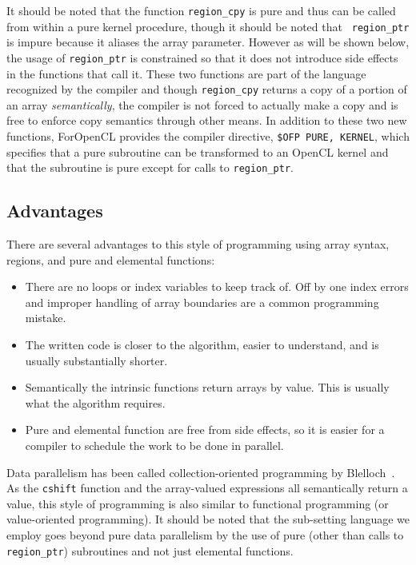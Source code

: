 It should be noted that the function {\tt region\_cpy} is pure and thus can be
called from within a pure kernel procedure, though it should be noted that {\tt
region\_ptr} is impure because it aliases the array parameter.  However as will
be shown below, the usage of {\tt region\_ptr} is constrained so that it does not
introduce side effects in the functions that call it.  These two functions are
part of the language recognized by the compiler and though {\tt region\_cpy}
returns a copy of a portion of an array \emph{semantically}, the compiler is not
forced to actually make a copy and is free to enforce copy semantics through
other means.  In addition to these two new functions, ForOpenCL provides the
compiler directive, {\tt \!\$OFP PURE, KERNEL}, which specifies that a pure subroutine
can be transformed to an OpenCL kernel and that the subroutine is pure
except for calls to {\tt region\_ptr}.

\subsection{Advantages}

There are several advantages to this style of programming using array
syntax, regions, and pure and elemental functions:

\begin{itemize}
\item There are no loops or index variables to keep track of.  Off by
  one index errors and improper handling of array boundaries are a
  common programming mistake.
\item The written code is closer to the algorithm, easier to
  understand, and is usually substantially shorter.
\item Semantically the intrinsic functions return arrays by value.
  This is usually what the algorithm requires.
\item Pure and elemental function are free from side effects, so it is
  easier for a compiler to schedule the work to be done in parallel.
\end{itemize}

Data parallelism has been called collection-oriented programming by
Blelloch~\cite{blelloch90}.  As the {\tt cshift} function and the array-valued
expressions all semantically return a value, this style of programming is also
similar to functional programming (or value-oriented programming).  It should be
noted that the sub-setting language we employ goes beyond pure data parallelism
by the use of pure (other than calls to {\tt region\_ptr}) subroutines and
not just elemental functions.

